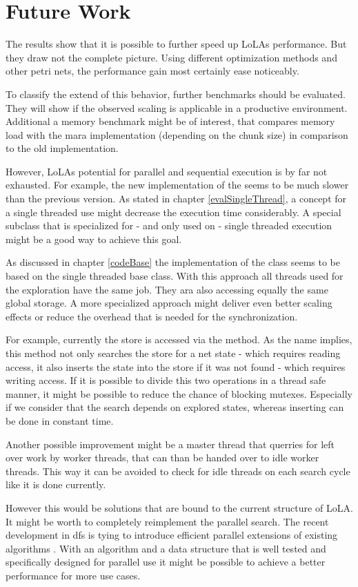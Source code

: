\chapter{Future Work}
The results show that it is possible to further speed up LoLAs performance. But they draw not the complete picture. Using different optimization methods and other petri nets, the performance gain most certainly ease noticeably.

To classify the extend of this behavior, further benchmarks should be evaluated. They will show if the observed scaling is applicable in a productive environment. Additional a memory benchmark might be of interest, that compares memory load with the mara implementation (depending on the chunk size) in comparison to the old implementation.

However, LoLAs potential for parallel and sequential execution is by far not exhausted. For example, the new implementation of the  seems to be much slower than the previous version. As stated in chapter \ref{evalSingleThread}, a concept for a single threaded use might decrease the execution time considerably. A special subclass that is specialized for - and only used on - single threaded execution might be a good way to achieve this goal.

As discussed in chapter \ref{codeBase} the implementation of the  class seems to be based on the single threaded base class. With this approach all threads used for the exploration have the same job. They ara also accessing equally the same global storage. A more specialized approach might deliver even better scaling effects or reduce the overhead that is needed for the synchronization.

For example, currently the store is accessed via the  method. As the name implies, this method not only searches the store for a net state - which requires reading access, it also inserts the state into the store if it was not found - which requires writing access. If it is possible to divide this two operations in a thread safe manner, it might be possible to reduce the chance of blocking mutexes. Especially if we consider that the search depends on explored states, whereas inserting can be done in constant time.

Another possible improvement might be a master thread that querries for left over work by worker threads, that can than be handed over to idle worker threads. This way it can be avoided to check for idle threads on each search cycle like it is done currently.

However this would be solutions that are bound to the current structure of LoLA. It might be worth to completely reimplement the parallel search. The recent development in dfs is tying to introduce efficient parallel extensions of existing algorithms \cite{bloemen2016multi} \cite{holzmann2008stack}. With an algorithm and a data structure that is well tested and specifically designed for parallel use it might be possible to achieve a better performance for more use cases.